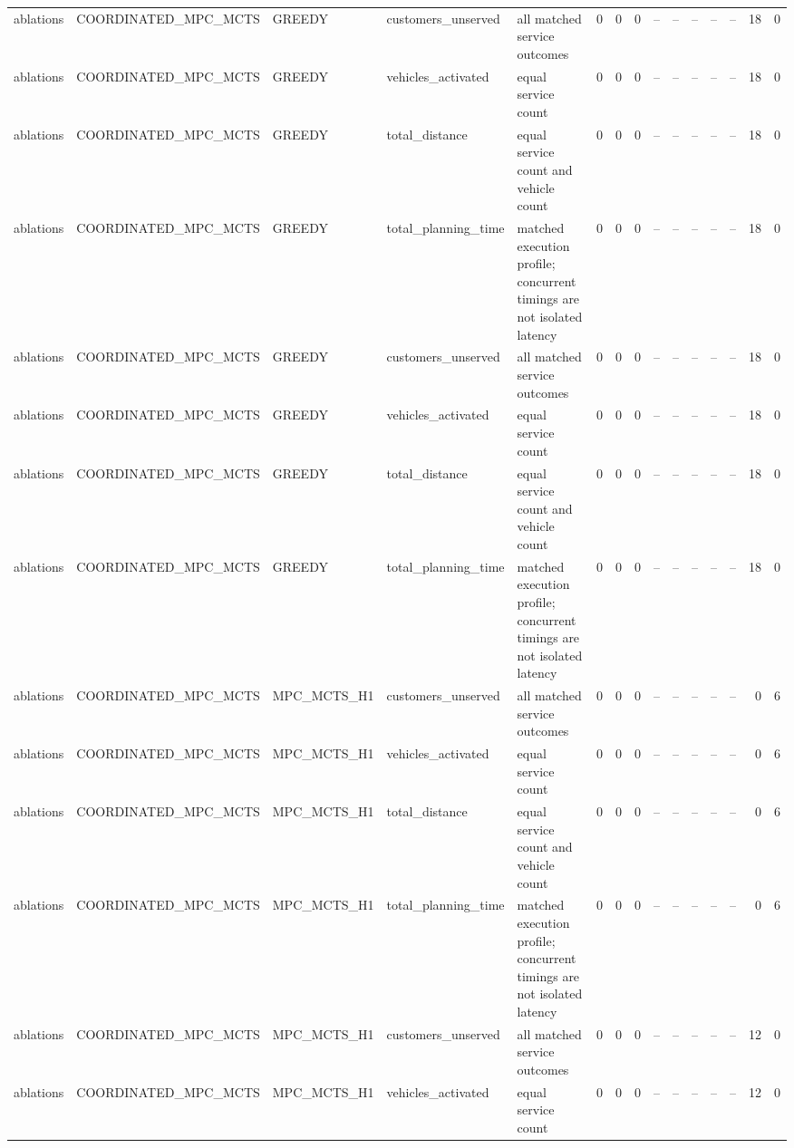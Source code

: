 \begin{table}
{\begin{tabular}{lllllrrrrrrrrrr}
ablations & COORDINATED\_MPC\_MCTS & GREEDY & customers\_unserved & all matched service outcomes & 0 & 0 & 0 & -- & -- & -- & -- & -- & 18 & 0 \\
ablations & COORDINATED\_MPC\_MCTS & GREEDY & vehicles\_activated & equal service count & 0 & 0 & 0 & -- & -- & -- & -- & -- & 18 & 0 \\
ablations & COORDINATED\_MPC\_MCTS & GREEDY & total\_distance & equal service count and vehicle count & 0 & 0 & 0 & -- & -- & -- & -- & -- & 18 & 0 \\
ablations & COORDINATED\_MPC\_MCTS & GREEDY & total\_planning\_time & matched execution profile; concurrent timings are not isolated latency & 0 & 0 & 0 & -- & -- & -- & -- & -- & 18 & 0 \\
ablations & COORDINATED\_MPC\_MCTS & GREEDY & customers\_unserved & all matched service outcomes & 0 & 0 & 0 & -- & -- & -- & -- & -- & 18 & 0 \\
ablations & COORDINATED\_MPC\_MCTS & GREEDY & vehicles\_activated & equal service count & 0 & 0 & 0 & -- & -- & -- & -- & -- & 18 & 0 \\
ablations & COORDINATED\_MPC\_MCTS & GREEDY & total\_distance & equal service count and vehicle count & 0 & 0 & 0 & -- & -- & -- & -- & -- & 18 & 0 \\
ablations & COORDINATED\_MPC\_MCTS & GREEDY & total\_planning\_time & matched execution profile; concurrent timings are not isolated latency & 0 & 0 & 0 & -- & -- & -- & -- & -- & 18 & 0 \\
ablations & COORDINATED\_MPC\_MCTS & MPC\_MCTS\_H1 & customers\_unserved & all matched service outcomes & 0 & 0 & 0 & -- & -- & -- & -- & -- & 0 & 6 \\
ablations & COORDINATED\_MPC\_MCTS & MPC\_MCTS\_H1 & vehicles\_activated & equal service count & 0 & 0 & 0 & -- & -- & -- & -- & -- & 0 & 6 \\
ablations & COORDINATED\_MPC\_MCTS & MPC\_MCTS\_H1 & total\_distance & equal service count and vehicle count & 0 & 0 & 0 & -- & -- & -- & -- & -- & 0 & 6 \\
ablations & COORDINATED\_MPC\_MCTS & MPC\_MCTS\_H1 & total\_planning\_time & matched execution profile; concurrent timings are not isolated latency & 0 & 0 & 0 & -- & -- & -- & -- & -- & 0 & 6 \\
ablations & COORDINATED\_MPC\_MCTS & MPC\_MCTS\_H1 & customers\_unserved & all matched service outcomes & 0 & 0 & 0 & -- & -- & -- & -- & -- & 12 & 0 \\
ablations & COORDINATED\_MPC\_MCTS & MPC\_MCTS\_H1 & vehicles\_activated & equal service count & 0 & 0 & 0 & -- & -- & -- & -- & -- & 12 & 0 \\

\end{tabular}}
\end{table}
